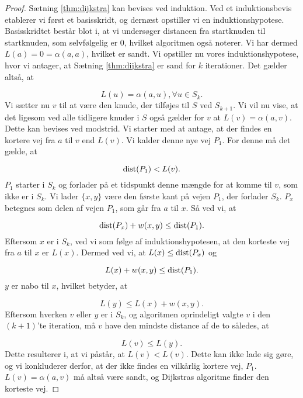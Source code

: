 \begin{proof}
Sætning \ref{thm:dijkstra} kan bevises ved induktion. Ved et induktionsbevis etablerer vi først et basisskridt, og dernæst opstiller vi en induktionshypotese. Basisskridtet består blot i, at vi undersøger distancen fra startknuden til startknuden, som selvfølgelig er 0, hvilket algoritmen også noterer. Vi har dermed $L(a)=0= \alpha(a,a)$, hvilket er sandt.
Vi opstiller nu vores induktionshypotese, hvor vi antager, at Sætning \ref{thm:dijkstra} er sand for $k$ iterationer. Det gælder altså, at

\begin{equation}
L(u) = \alpha(a,u), \forall u \in S_k. 
\end{equation} %
Vi sætter nu $v$ til at være den knude, der tilføjes til $S$ ved $S_{k+1}$. Vi vil nu vise, at det ligesom ved alle tidligere knuder i $S$ også gælder for $v$ at $L(v)=\alpha(a,v)$. Dette kan bevises ved modstrid. Vi starter med at antage, at der findes en kortere vej fra $a$ til $v$ end $L(v)$. Vi kalder denne nye vej $P_1$. For denne må det gælde, at

\begin{equation}
\textrm{dist}(P_1)<L(v).
\end{equation} %
$P_1$ starter i $S_k$ og forlader på et tidspunkt denne mængde for at komme til $v$, som ikke er i $S_k$. Vi lader $\{x,y\}$ være den første kant på vejen $P_1$, der forlader $S_k$. $P_x$ betegnes som delen af vejen $P_1$, som går fra $a$ til $x$. Så ved vi, at

\begin{equation}
\textrm{dist}(P_x)+w(x,y) \leq \textrm{dist}(P_1).
\end{equation}
Eftersom $x$ er i $S_k$, ved vi som følge af induktionshypotesen, at den korteste vej fra $a$ til $x$ er $L(x)$. Dermed ved vi, at $L(x) \leq \textrm{dist}(P_x)$ og

\begin{equation}
L(x) + w(x,y) \leq \textrm{dist}(P_1).
\end{equation}
$y$ er nabo til $x$, hvilket betyder, at

\begin{equation}
L(y) \leq L(x) + w(x,y).
\end{equation}
Eftersom hverken $v$ eller $y$ er i $S_k$, og algoritmen oprindeligt valgte $v$ i den $(k+1)$'te iteration, må $v$ have den mindste distance af de to således, at

\begin{equation}
L(v) \leq L(y).
\end{equation}
Dette resulterer i, at vi påstår, at $L(v) < L(v)$. Dette kan ikke lade sig gøre, og vi konkluderer derfor, at der ikke findes en vilkårlig kortere vej, $P_1$. $L(v)=\alpha(a,v)$ må altså være sandt, og Dijkstras algoritme finder den korteste vej.
\end{proof}
